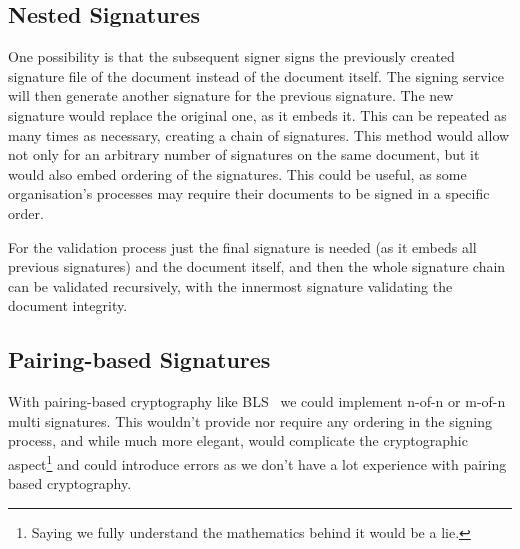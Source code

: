 \subsection{Nested Signatures}
One possibility is that the subsequent signer signs the previously created signature file of the document instead of the document itself.
The signing service will then generate another signature for the previous signature.
The new signature would replace the original one, as it embeds it.
This can be repeated as many times as necessary, creating a chain of signatures.
This method would allow not only for an arbitrary number of signatures on the same document,
but it would also embed ordering of the signatures.
This could be useful, as some organisation's processes may require their documents to be signed in a specific order.

For the validation process just the final signature is needed (as it embeds all previous signatures) and the document itself,
and then the whole signature chain can be validated recursively,
with the innermost signature validating the document integrity.

\subsection{Pairing-based Signatures}
With pairing-based cryptography like \gls{BLS}~\cite{bls} we could implement n-of-n or m-of-n multi signatures.
This wouldn't provide nor require any ordering in the signing process, and while much more elegant,
would complicate the cryptographic aspect\footnote{Saying we fully understand the mathematics behind it would be a lie.} and could introduce errors as we don't have a lot experience with pairing based cryptography.


